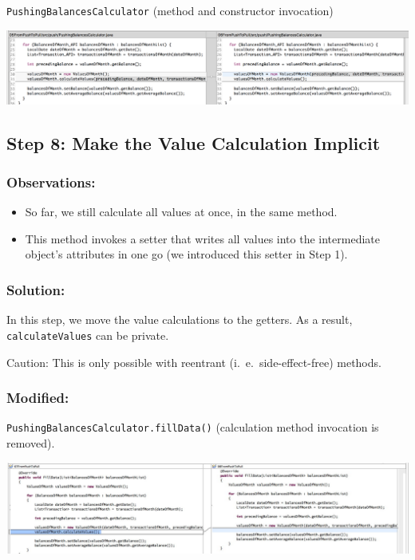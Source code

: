 \documentclass[a4paper,fleqn,titlepage,11pt]{article}
\begin{document}
\texttt{PushingBalancesCalculator} (method and constructor invocation)

\includegraphics[width=1\textwidth]{CompareViews/05-07-1.png}




\subsection*{Step 8: Make the Value Calculation Implicit}

\subsubsection*{Observations:}
\begin{itemize}
\item So far, we still calculate all values at once, in the same method. 
\item This method invokes a setter that writes all values into the intermediate object's attributes in one go (we introduced this setter in Step 1).
\end{itemize}

\subsubsection*{Solution:}
In this step, we move the value calculations to the getters. As a result, \texttt{calculateValues} can be private.

Caution: This is only possible with reentrant (i.~e.~side-effect-free) methods.

\subsubsection*{Modified:}

\texttt{PushingBalancesCalculator.fillData()} (calculation method invocation is removed).

\includegraphics[width=1\textwidth]{CompareViews/07-08-1.jpg}
\end{document}
